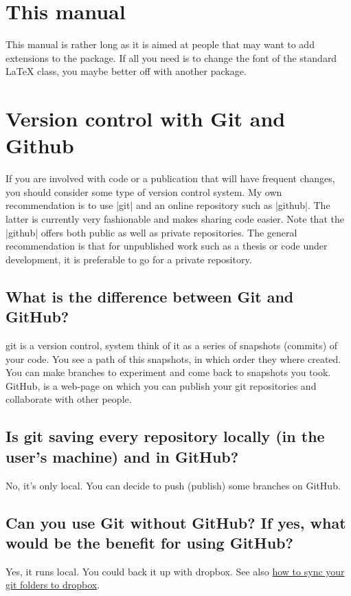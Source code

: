 \section{This manual}

This manual is rather long as it is aimed at people that may want to add extensions to the package. If all you need is to change the font of the standard LaTeX class, you maybe better off with another package. 

 \section{Version control with Git and Github}
 If you are involved with code or a publication that will have frequent changes, you should consider
 some type of version control system. My own recommendation is to use |git| and an online repository such
 as |github|. The latter is currently very fashionable and makes sharing code easier. Note that the |github|
 offers both public as well as private repositories. The general recommendation is that for unpublished work
 such as a thesis or code under development, it is preferable to go for a private repository. 
 
 \subsection*{What is the difference between Git and GitHub?}
git is a version control, system think of it as a series of snapshots (commits) of your code. You see 
a path of this snapshots, in which order they where created. You can make branches to experiment and come back to snapshots you took.
GitHub, is a web-page on which you can publish your git repositories and collaborate with other people.

 \subsection*{Is git saving every repository locally (in the user's machine) and in GitHub?}

 No, it's only local. You can decide to push (publish) some branches on GitHub.

 \subsection*{Can you use Git without GitHub? If yes, what would be the benefit for using GitHub?}

 Yes, it runs local. You could back it up with dropbox. See also \href{http://dotmonster.co/backup-and-sync-folders-with-dropbox-and-symbolic-links/}{how to sync your git folders to dropbox}.

